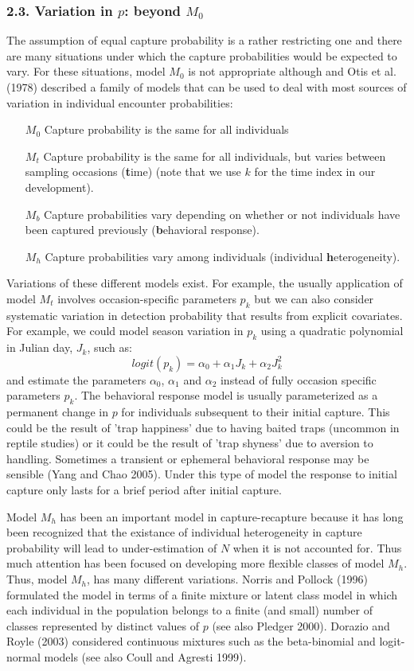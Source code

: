 \documentclass{book}
\begin{document}
\subsubsection*{2.3. Variation in $p$: beyond $M_0$}

The assumption of equal capture probability is a rather restricting
one and there are many situations under which the capture
probabilities would be expected to vary. For these situations, model
$M_0$ is not appropriate although and Otis et al. (1978) described a
family of models that can be used to deal with most sources of
variation in individual encounter probabilities:
\begin{itemize}
\item[$M_0$] Capture probability is the same for all individuals
\item[$M_t$] Capture probability is the same for all individuals, but
  varies between sampling occasions (\textbf{t}ime) (note that we use
  $k$ for the time index in our development).
\item[$M_b$] Capture probabilities vary depending on whether or not
  individuals have been captured previously (\textbf{b}ehavioral
  response).
\item[$M_h$] Capture probabilities vary among individuals (individual
  \textbf{h}eterogeneity).
\end{itemize}

Variations of these different models exist. For example, the usually
application of model $M_t$ involves occasion-specific parameters
$p_{k}$ but we can also consider systematic variation in detection
probability that results from explicit covariates. For example, we
could model season variation in $p_k$ using a quadratic polynomial
in Julian day, $J_{k}$, such as:
\[
 logit(p_{k}) = \alpha_0 + \alpha_1 J_{k} + \alpha_2 J^{2}_{k}
\]
and estimate the parameters $\alpha_0$, $\alpha_1$ and $\alpha_2$
instead of fully occasion specific parameters $p_k$.  The behavioral
response model is usually parameterized as a permanent change in $p$
for individuals subsequent to their initial capture. This could be the
result of 'trap happiness' due to having baited traps (uncommon in
reptile studies) or it could be the result of 'trap shyness' due to
aversion to handling. Sometimes a transient or ephemeral behavioral
response may be sensible (Yang and Chao 2005). Under this type of
model the response to initial capture only lasts for a brief period
after initial capture. 

Model $M_h$ has been an important model in capture-recapture because
it has long been recognized that the existance of individual
heterogeneity in capture probability will lead to under-estimation of
$N$ when it is not accounted for.  Thus much attention has been
focused on developing more flexible classes of model $M_h$.  Thus,
model $M_h$, has many different variations. Norris and Pollock (1996)
formulated the model in terms of a finite mixture or latent class
model in which each individual in the population belongs to a finite
(and small) number of classes represented by distinct values of $p$
(see also Pledger 2000). Dorazio and Royle (2003) considered
continuous mixtures such as the beta-binomial and logit-normal models
(see also Coull and Agresti 1999).
\end{document}
